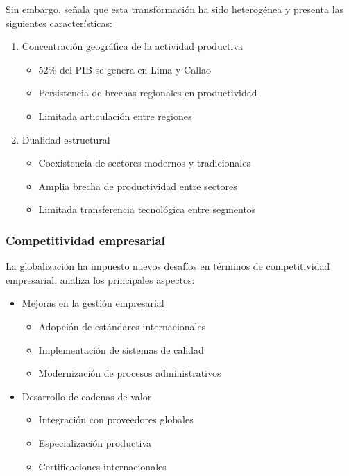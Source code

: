 \documentclass[12pt, a4paper]{article}
\begin{document}
Sin embargo, \textcite{gonzales2019} señala que esta transformación ha sido heterogénea y presenta las siguientes características:

\begin{enumerate}
    \item Concentración geográfica de la actividad productiva
    \begin{itemize}
        \item 52\% del PIB se genera en Lima y Callao
        \item Persistencia de brechas regionales en productividad
        \item Limitada articulación entre regiones
    \end{itemize}
    
    \item Dualidad estructural
    \begin{itemize}
        \item Coexistencia de sectores modernos y tradicionales
        \item Amplia brecha de productividad entre sectores
        \item Limitada transferencia tecnológica entre segmentos
    \end{itemize}
\end{enumerate}

\subsubsection{Competitividad empresarial}
La globalización ha impuesto nuevos desafíos en términos de competitividad empresarial. \textcite{torres2021} analiza los principales aspectos:

\begin{itemize}
    \item Mejoras en la gestión empresarial
    \begin{itemize}
        \item Adopción de estándares internacionales
        \item Implementación de sistemas de calidad
        \item Modernización de procesos administrativos
    \end{itemize}
    
    \item Desarrollo de cadenas de valor
    \begin{itemize}
        \item Integración con proveedores globales
        \item Especialización productiva
        \item Certificaciones internacionales
    \end{itemize}
\end{itemize}
\end{document}
